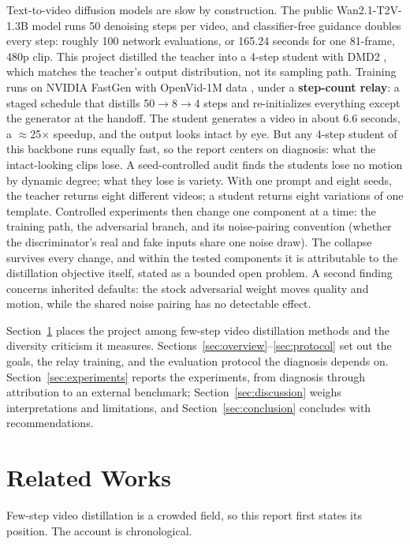 \documentclass[11pt,a4paper]{article}
\begin{document}
Text-to-video diffusion models are slow by construction. The public Wan2.1-T2V-1.3B model \cite{wan21} runs 50 denoising steps per video, and classifier-free guidance doubles every step: roughly 100 network evaluations, or 165.24 seconds for one 81-frame, 480p clip. This project distilled the teacher into a 4-step student with DMD2 \cite{dmd2}, which matches the teacher's output distribution, not its sampling path. Training runs on NVIDIA FastGen \cite{fastgen} with OpenVid-1M data \cite{openvid}, under a \textbf{step-count relay}: a staged schedule that distills 50$\to$8$\to$4 steps and re-initializes everything except the generator at the handoff. The student generates a video in about 6.6 seconds, a $\approx$25$\times$ speedup, and the output looks intact by eye. But any 4-step student of this backbone runs equally fast, so the report centers on diagnosis: what the intact-looking clips lose. A seed-controlled audit finds the students lose no motion by dynamic degree; what they lose is variety. With one prompt and eight seeds, the teacher returns eight different videos; a student returns eight variations of one template. Controlled experiments then change one component at a time: the training path, the adversarial branch, and its noise-pairing convention (whether the discriminator's real and fake inputs share one noise draw). The collapse survives every change, and within the tested components it is attributable to the distillation objective itself, stated as a bounded open problem. A second finding concerns inherited defaults: the stock adversarial weight moves quality and motion, while the shared noise pairing has no detectable effect.

Section~\ref{sec:related} places the project among few-step video distillation methods and the diversity criticism it measures. Sections~\ref{sec:overview}--\ref{sec:protocol} set out the goals, the relay training, and the evaluation protocol the diagnosis depends on. Section~\ref{sec:experiments} reports the experiments, from diagnosis through attribution to an external benchmark; Section~\ref{sec:discussion} weighs interpretations and limitations, and Section~\ref{sec:conclusion} concludes with recommendations.

\section{Related Works}\label{sec:related}

Few-step video distillation is a crowded field, so this report first states its position. The account is chronological.
\end{document}
